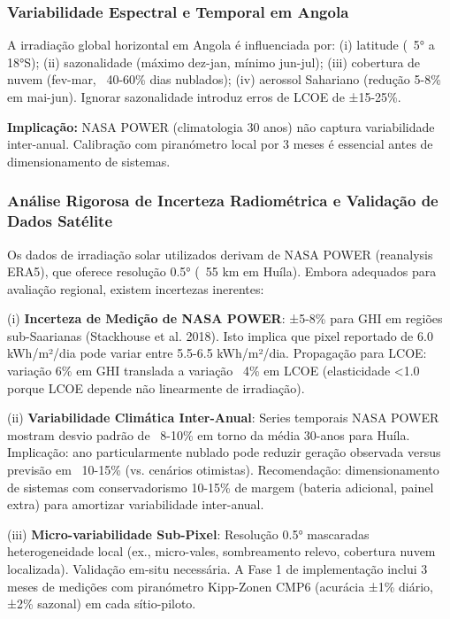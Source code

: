 \documentclass[12pt, a4paper]{article}
\begin{document}
\subsubsection{Variabilidade Espectral e Temporal em Angola}

A irradiação global horizontal em Angola é influenciada por: (i) latitude (~5° a 18°S); (ii) sazonalidade (máximo dez-jan, mínimo jun-jul); (iii) cobertura de nuvem (fev-mar, ~40-60\% dias nublados); (iv) aerossol Sahariano (redução 5-8\% em mai-jun). Ignorar sazonalidade introduz erros de LCOE de ±15-25\%.

\textbf{Implicação:} NASA POWER (climatologia 30 anos) não captura variabilidade inter-anual. Calibração com piranómetro local por 3 meses é essencial antes de dimensionamento de sistemas.

\subsubsection{Análise Rigorosa de Incerteza Radiométrica e Validação de Dados Satélite}

Os dados de irradiação solar utilizados derivam de NASA POWER (reanalysis ERA5), que oferece resolução 0.5° (~55 km em Huíla). Embora adequados para avaliação regional, existem incertezas inerentes:

(i) \textbf{Incerteza de Medição de NASA POWER}: ±5-8\% para GHI em regiões sub-Saarianas (Stackhouse et al. 2018). Isto implica que pixel reportado de 6.0 kWh/m²/dia pode variar entre 5.5-6.5 kWh/m²/dia. Propagação para LCOE: variação 6\% em GHI translada a variação ~4\% em LCOE (elasticidade <1.0 porque LCOE depende não linearmente de irradiação).

(ii) \textbf{Variabilidade Climática Inter-Anual}: Series temporais NASA POWER mostram desvio padrão de ~8-10\% em torno da média 30-anos para Huíla. Implicação: ano particularmente nublado pode reduzir geração observada versus previsão em ~10-15\% (vs. cenários otimistas). Recomendação: dimensionamento de sistemas com conservadorismo 10-15\% de margem (bateria adicional, painel extra) para amortizar variabilidade inter-anual.

(iii) \textbf{Micro-variabilidade Sub-Pixel}: Resolução 0.5° mascaradas heterogeneidade local (ex., micro-vales, sombreamento relevo, cobertura nuvem localizada). Validação em-situ necessária. A Fase 1 de implementação inclui 3 meses de medições com piranómetro Kipp-Zonen CMP6 (acurácia ±1\% diário, ±2\% sazonal) em cada sítio-piloto.
\end{document}
